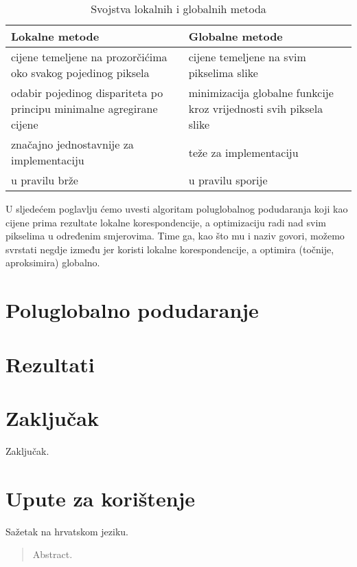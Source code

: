 \documentclass[utf8, zavrsni, numeric]{fer}
\begin{document}
\begin{table}[htbp]
  \caption{Svojstva lokalnih i globalnih metoda}
  \label{tbl:usp_lok_glob}
  \centering
  \begin{tabularx}{\textwidth}{X|X} \hline
    {\bf Lokalne metode} & {\bf Globalne metode} \\
    \hline
    cijene temeljene na prozorčićima oko svakog pojedinog piksela & cijene temeljene na svim pikselima slike \\
    \hline
    odabir pojedinog dispariteta po principu minimalne agregirane cijene & minimizacija globalne funkcije kroz vrijednosti svih piksela slike \\
    \hline
    značajno jednostavnije za implementaciju & teže za implementaciju \\
    \hline
    u pravilu brže & u pravilu sporije \\
  \end{tabularx}
\end{table}

U sljedećem poglavlju ćemo uvesti algoritam poluglobalnog podudaranja koji kao cijene prima rezultate lokalne korespondencije, a optimizaciju radi nad svim
pikselima u određenim smjerovima. Time ga, kao što mu i naziv govori, možemo svrstati negdje između jer koristi lokalne korespondencije, a optimira (točnije, aproksimira) globalno.


\chapter{Poluglobalno podudaranje}

\chapter{Rezultati}

\chapter{Zaključak}
Zaključak.

\appendix
\chapter{Upute za korištenje}




\begin{sazetak}
  Sažetak na hrvatskom jeziku.

\end{sazetak}

\begin{abstract}
Abstract.

\end{abstract}
\end{document}
